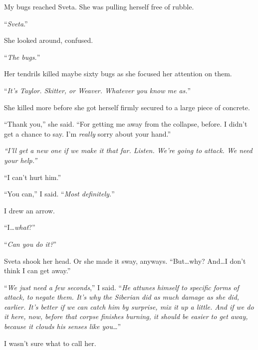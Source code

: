 My bugs reached Sveta.  She was pulling herself free of rubble.



``\emph{Sveta}.''



She looked around, confused.



``\emph{The bugs.}''



Her tendrils killed maybe sixty bugs as she focused her attention on them.



``\emph{It's Taylor.  Skitter, or Weaver.  Whatever you know me as.}''



She killed more before she got herself firmly secured to a large piece of concrete.



``Thank you,'' she said.  ``For getting me away from the collapse, before.  I didn't get a chance to say.  I'm \emph{really} sorry about your hand.''



\emph{``I'll get a new one if we make it that far.  Listen.  We're going to attack.  We need your help.''}



``I can't hurt him.''



``You can,'' I said.  ``\emph{Most definitely.}''



I drew an arrow.



``I\ldots \emph{what}?''



``\emph{Can you do it?}''



Sveta shook her head.  Or she made it sway, anyways.  ``But\ldots why?  And\ldots I don't think I can get away.''



``\emph{We just need a few seconds},'' I said.  ``\emph{He attunes himself to specific forms of attack, to negate them.  It's why the Siberian did as much damage as she did, earlier.  It's better if we can catch him by surprise, mix it up a little.  And if we do it here, now, before that corpse finishes burning, it should be easier to get away, because it clouds his senses like you\ldots}''



I wasn't sure what to call her.



